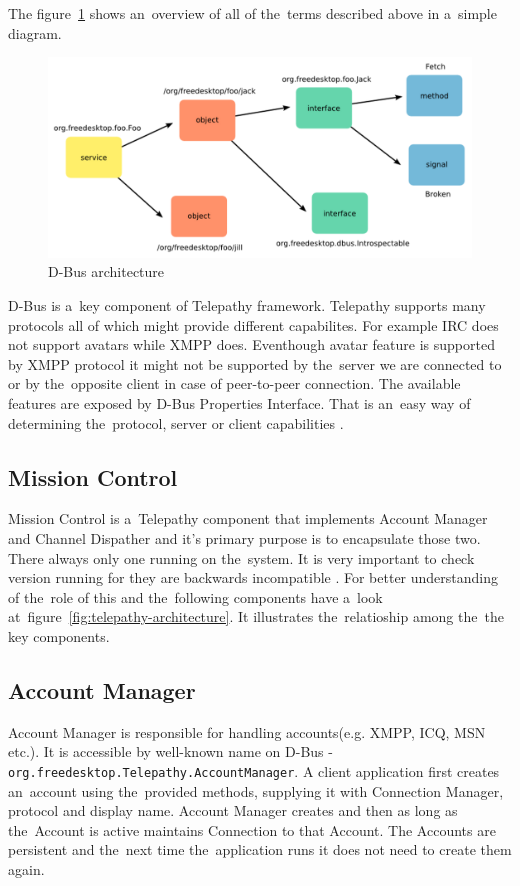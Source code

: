 The figure~\ref{fig:dbusArchitecture} shows an~overview of all of the~terms described above in a~simple diagram.

\begin{figure}[ht]
\begin{center}
	\includegraphics[width=15cm]{fig/dbus-architecture-overview.png}
	\caption{D-Bus architecture \cite{TPWiki}}
	\label{fig:dbusArchitecture}
\end{center}
\end{figure}

D-Bus is a~key component of Telepathy framework. Telepathy supports many protocols all of which might provide different capabilites. For example IRC does not support avatars while XMPP does. Eventhough avatar feature is supported by XMPP protocol it might not be supported by the~server we are connected to or by the~opposite client in case of peer-to-peer connection. The available features are exposed by D-Bus Properties Interface. That is an~easy way of determining the~protocol, server or client capabilities \cite{dbus}.

\subsection*{Mission Control}
Mission Control is a~Telepathy component that implements Account Manager and Channel Dispather and it's primary purpose is to encapsulate those two. There always only one running on the~system. It is very important to check version running for they are backwards incompatible \cite{TPWiki}. For better understanding of the~role of this and the~following components have a~look at~figure~\ref{fig:telepathy-architecture}. It illustrates the~relatioship among the~the key components.

\subsection*{Account Manager}
Account Manager is responsible for handling accounts(e.g. XMPP, ICQ, MSN etc.). It is accessible by well-known name on D-Bus - \verb|org.freedesktop.Telepathy.AccountManager|. A client application first creates an~account using the~provided methods, supplying it with Connection Manager, protocol and display name. Account Manager creates and then as long as the~Account is active maintains Connection to that Account. The Accounts are persistent and the~next time the~application runs it does not need to create them again. 

